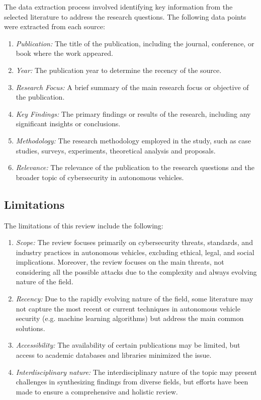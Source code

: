 The data extraction process involved identifying key information from the selected literature to address the research questions.
The following data points were extracted from each source:
\begin{enumerate}
    \item \textit{Publication:} The title of the publication, including the journal, conference, or book where the work appeared.
    \item \textit{Year:} The publication year to determine the recency of the source.
    \item \textit{Research Focus:} A brief summary of the main research focus or objective of the publication.
    \item \textit{Key Findings:} The primary findings or results of the research, including any significant insights or conclusions.
    \item \textit{Methodology:} The research methodology employed in the study, such as case studies, surveys, experiments, theoretical analysis and proposals.
    \item \textit{Relevance:} The relevance of the publication to the research questions and the broader topic of cybersecurity in autonomous vehicles.
\end{enumerate}

\subsection{Limitations}\label{subsec:limitations}

The limitations of this review include the following:
\begin{enumerate}
    \item \textit{Scope:} The review focuses primarily on cybersecurity threats, standards, and industry practices in autonomous vehicles, excluding ethical, legal, and social implications.
    Moreover, the review focuses on the main threats, not considering all the possible attacks due to the complexity and always evolving nature of the field.
    \item \textit{Recency:} Due to the rapidly evolving nature of the field, some literature may not capture the most recent or current techniques in autonomous vehicle security (e.g. machine learning algorithms) but address the main common solutions.
    \item \textit{Accessibility:} The availability of certain publications may be limited, but access to academic databases and libraries minimized the issue.
    \item \textit{Interdisciplinary nature:} The interdisciplinary nature of the topic may present challenges in synthesizing findings from diverse fields, but efforts have been made to ensure a comprehensive and holistic review.
\end{enumerate}

